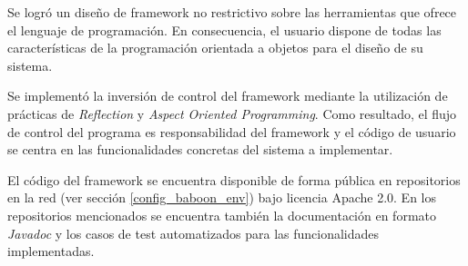 Se logró un diseño de framework no restrictivo sobre las herramientas
que ofrece el lenguaje de programación. En consecuencia, el usuario dispone
de todas las características de la programación orientada a objetos para el
diseño de su sistema.

Se implementó la inversión de control del framework mediante la utilización de
prácticas de \textit{Reflection} y \textit{Aspect Oriented Programming}. Como
resultado, el flujo de control del programa es responsabilidad del framework y
el código de usuario se centra en las funcionalidades concretas del sistema a implementar.

El código del framework se encuentra disponible de forma pública en repositorios
en la red (ver sección \ref{config_baboon_env}) bajo licencia Apache 2.0. En los
repositorios mencionados se encuentra también la documentación en formato \textit{Javadoc} y los casos de
test automatizados para las funcionalidades implementadas.

